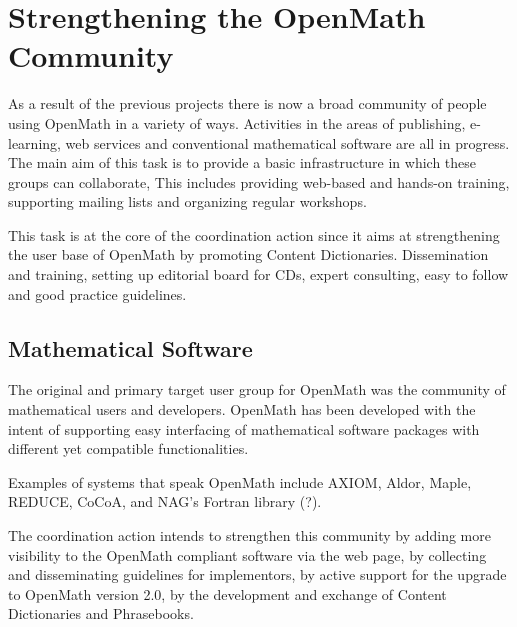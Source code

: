 \documentclass[draft]{artikel3}
\begin{document}
\section{Strengthening the OpenMath Community} 
\label{community}


As a result of the previous projects there is now a broad community of
people using OpenMath in a variety of ways.  Activities in the areas
of publishing, e-learning, web services and conventional mathematical
software are all in progress.  The main aim of this task is to provide
a basic infrastructure in which these groups can collaborate, This
includes providing web-based and hands-on training, supporting mailing
lists and organizing regular workshops.

This task is at the core of the coordination action since it aims at
strengthening the user base of OpenMath by promoting Content
Dictionaries. Dissemination and training, setting up editorial board
for CDs, expert consulting, easy to follow and good practice
guidelines.





\subsection{Mathematical Software}
\label{sec:msw}

The original and primary target user group for OpenMath was the
community of mathematical users and developers. OpenMath has been
developed with the intent of supporting easy interfacing of
mathematical software packages with different yet compatible
functionalities. 

Examples of systems that speak OpenMath include AXIOM, Aldor, Maple,
REDUCE, CoCoA, and NAG's Fortran library (?).

The coordination action intends to strengthen this community by adding
more visibility to the OpenMath compliant software via the web page,
by collecting and disseminating guidelines for implementors, by active
support for the upgrade to OpenMath version 2.0, by the development
and exchange of Content Dictionaries and Phrasebooks.
\end{document}
